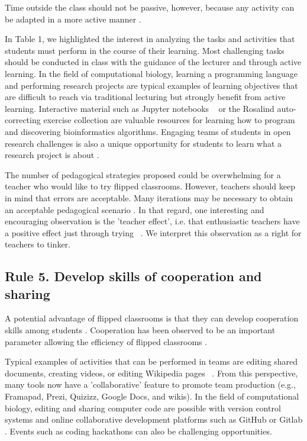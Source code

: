 \documentclass[10pt,letterpaper]{article}
\begin{document}
Time outside the class should not be passive, 
however, because any activity can be adapted in a more active manner \cite{chi_icap_2014}.

In Table 1, we highlighted the interest in analyzing the tasks and activities that students must perform in the course of their learning. 
Most challenging tasks should be conducted in class with the guidance of the lecturer and through active learning. 
In the field of computational biology, learning a programming language and performing research projects are typical examples of learning objectives that are difficult to reach via traditional lecturing but strongly benefit from active learning. 
Interactive material such as Jupyter notebooks ~\cite{davies_using_2020,rule_ten_2019,davies2020} or the Rosalind auto-correcting exercise collection \cite{compeau_bioinformatics_2018} are valuable resources for learning how to program and discovering bioinformatics algorithms.
Engaging teams of students in open research challenges is also a unique opportunity for students to learn what a research project is about \cite{abdollahi2018meet}.

The number of pedagogical strategies proposed could be overwhelming for a teacher who would like to try flipped classrooms. 
However, teachers should keep in mind that errors are acceptable. 
Many iterations may be necessary to obtain an acceptable pedagogical scenario \cite{compeau_establishing_2019}. 
In that regard, one interesting and encouraging observation is the 'teacher effect', i.e. that enthusiastic teachers have a positive effect just through trying ~\cite{hattie_visible_2008}. 
We interpret this observation as a right for teachers to tinker.


\subsection{Rule 5. Develop skills of cooperation and sharing}

A potential advantage of flipped classrooms is that they can develop cooperation skills among students \cite{strayer_how_2012}. 
Cooperation has been observed to be an important parameter allowing the efficiency of flipped classrooms \cite{foldnes_flipped_2016}.

Typical examples of activities that can be performed in teams are editing shared documents, creating videos, or editing Wikipedia pages ~\cite{logan_ten_2010}. From this perspective, many tools now have a 'collaborative' feature to promote team production (e.g., Framapad, Prezi, Quizizz, Google Docs, and wikis). 
In the field of computational biology, editing and sharing computer code \cite{abdollahi2018meet} are possible with version control systems and online collaborative development platforms such as GitHub or Gitlab \cite{blischak_quick_2016}. Events such as coding hackathons \cite{garcia2020} can also be challenging opportunities.
\end{document}
